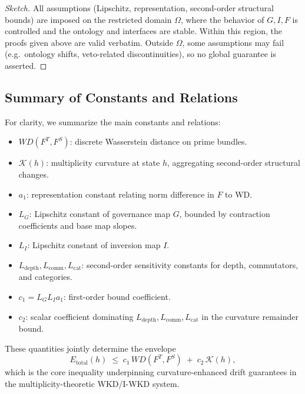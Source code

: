 \documentclass[11pt]{article}
\theoremstyle{definition}
\theoremstyle{plain}
\theoremstyle{remark}
\begin{document}
\begin{proof}[Sketch]
All assumptions (Lipschitz, representation, second-order structural bounds) are imposed on the restricted domain \(\Omega\), where the behavior of \(G,I,F\) is controlled and the ontology and interfaces are stable. Within this region, the proofs given above are valid verbatim. Outside \(\Omega\), some assumptions may fail (e.g.\ ontology shifts, veto-related discontinuities), so no global guarantee is asserted.
\end{proof}

\subsection{Summary of Constants and Relations}

For clarity, we summarize the main constants and relations:

\begin{itemize}[leftmargin=2em]
  \item \(WD(F^T,F^S)\): discrete Wasserstein distance on prime bundles.
  \item \(\mathcal{K}(h)\): multiplicity curvature at state \(h\), aggregating second-order structural changes.
  \item \(a_1\): representation constant relating norm difference in \(F\) to WD.
  \item \(L_G\): Lipschitz constant of governance map \(G\), bounded by contraction coefficients and base map slopes.
  \item \(L_I\): Lipschitz constant of inversion map \(I\).
  \item \(L_{\text{depth}},L_{\text{comm}},L_{\text{cat}}\): second-order sensitivity constants for depth, commutators, and categories.
  \item \(c_1 = L_G L_I a_1\): first-order bound coefficient.
  \item \(c_2\): scalar coefficient dominating \(L_{\text{depth}},L_{\text{comm}},L_{\text{cat}}\) in the curvature remainder bound.
\end{itemize}

These quantities jointly determine the envelope
\[
  E_{\text{total}}(h)
  \;\le\;
  c_1\, WD(F^T,F^S)
  \;+\;
  c_2\, \mathcal{K}(h),
\]
which is the core inequality underpinning curvature-enhanced drift guarantees in the multiplicity-theoretic WKD/I-WKD system.
\end{document}
